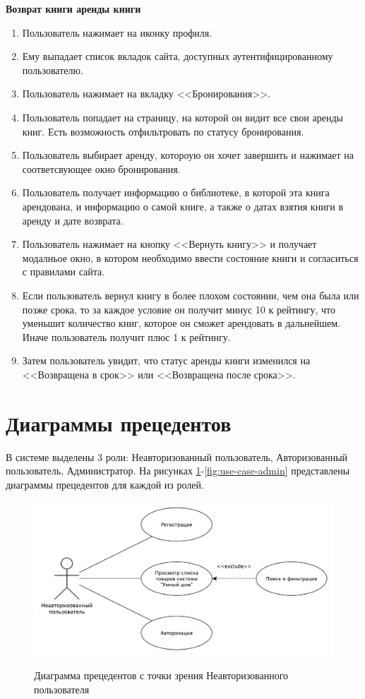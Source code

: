 \textbf{Возврат книги аренды книги}
\begin{enumerate}
	\item Пользователь нажимает на иконку профиля.
	\item Ему выпадает список вкладок сайта, доступных аутентифицированному пользователю.
  \item Пользователь нажимает на вкладку <<Бронирования>>.
	\item Пользователь попадает на страницу, на которой он видит все свои аренды книг. Есть возможность отфильтровать по статусу бронирования.
	\item Пользователь выбирает аренду, котороую он хочет завершить и нажимает на соответсвующее окно бронирования.
	\item Пользователь получает информацию о библиотеке, в которой эта книга арендована, и информацию о самой книге, а также о датах взятия книги в аренду и дате возврата.
  \item Пользователь нажимает на кнопку <<Вернуть книгу>> и получает модалньое окно, в котором необходимо ввести состояние книги и согласиться с правилами сайта.
  \item Если пользователь вернул книгу в более плохом состоянии, чем она была или позже срока, то за каждое условие он получит минус 10 к рейтингу, что уменьшит количество книг, которое он сможет арендовать в дальнейшем. Иначе пользователь получит плюс 1 к рейтингу.
  \item Затем пользователь увидит, что статус аренды книги изменился на <<Возвращена в срок>> или <<Возвращена после срока>>.
\end{enumerate}


\section{Диаграммы прецедентов}
В системе выделены 3 роли: Неавторизованный пользователь, Авторизованный пользователь, Администратор. На рисунках \ref{fig:use-case-non-auth}-\ref{fig:use-case-admin} представлены диаграммы прецедентов для каждой из ролей.

\begin{figure}[H]
	\begin{center}
		{\includegraphics[scale = 0.5]{../img/use-case/non-auth-user.pdf}}
		\caption{Диаграмма прецедентов с точки зрения Неавторизованного пользователя}
		\label{fig:use-case-non-auth}
	\end{center}
\end{figure}

